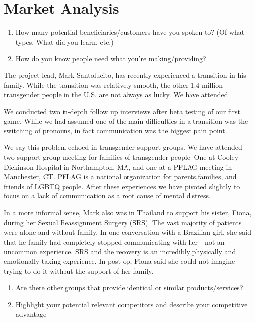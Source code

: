 

\section{Market Analysis} 
 
\begin{enumerate}
\itemsep-0.5em 
    \item How many potential beneficiaries/customers have you spoken to? (Of what types, What did you learn, etc.)
    \item How do you know people need what you’re making/providing?
\end{enumerate}

The project lead, Mark Santolucito, has recently experienced a transition in his family. While the transition was relatively smooth, the other 1.4 million transgender people in the U.S. are not always as lucky.
We have attended 

We conducted two in-depth follow up interviews after beta testing of our first game.
While we had assumed one of the main difficulties in a transition was the switching of pronouns, in fact communication was the biggest pain point.

We say this problem echoed in transgender support groups.
We have attended two support group meeting for families of transgender people.
One at Cooley-Dickinson  Hospital  in  Northampton,  MA,  and  one  at  a  PFLAG  meeting  in Manchester,  CT. 
PFLAG  is  a  national  organization  for  parents,families,  and friends of LGBTQ people. 
After these experiences we have pivoted slightly to focus on a lack of communication as a root cause of mental distress.

In a more informal sense, Mark also was in Thailand to support his sister, Fiona, during her Sexual Reassignment Surgery (SRS).
The vast majority of patients were alone and without family.
In one conversation with a Brazilian girl, she said that he family had completely stopped communicating with her - not an uncommon experience.
SRS and the recovery is an incredibly physically and emotionally taxing experience.
In post-op, Fiona said she could not imagine trying to do it without the support of her family.

\begin{enumerate}
\itemsep-0.5em 
    \item Are there other groups that provide identical or similar products/services?
    \item Highlight your potential relevant competitors and describe your competitive advantage
\end{enumerate}

